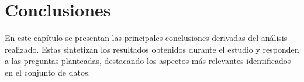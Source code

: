 \chapter{Conclusiones}

En este capítulo se presentan las principales conclusiones derivadas del análisis realizado. Estas sintetizan los resultados obtenidos durante el estudio y responden a las preguntas planteadas, destacando los aspectos más relevantes identificados en el conjunto de datos.

